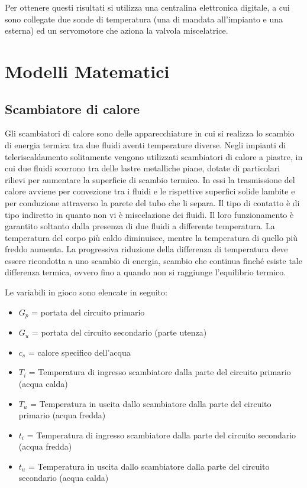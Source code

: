 \documentclass[laurea,oneside,11pt]{USiena_tesiLM}
\begin{document}
Per ottenere questi risultati si utilizza una centralina elettronica digitale, a cui sono collegate due sonde di temperatura (una di mandata all'impianto e una esterna) ed un servomotore che aziona la valvola miscelatrice. 

\chapter{Modelli Matematici}

\section{Scambiatore di calore}
\label{subsec:scambiatore_di_calore}
Gli scambiatori di calore sono  delle apparecchiature in cui si realizza lo scambio di energia termica tra due fluidi aventi temperature diverse. Negli impianti di teleriscaldamento solitamente vengono utilizzati scambiatori di calore a piastre, in cui due fluidi scorrono tra delle lastre metalliche piane, dotate di particolari rilievi per aumentare la superficie di scambio termico. In essi la trasmissione del calore avviene per convezione tra i fluidi e le rispettive superfici solide lambite e per conduzione attraverso la parete del tubo che li separa. Il tipo di contatto è di tipo indiretto in quanto non vi è miscelazione dei fluidi.
Il loro funzionamento è garantito soltanto dalla presenza di due fluidi a differente temperatura. La temperatura del corpo più caldo diminuisce, mentre la temperatura di quello più freddo aumenta. La progressiva riduzione della differenza di temperatura deve essere ricondotta a uno scambio di energia, scambio che continua finché esiste tale differenza termica, ovvero fino a quando non si raggiunge l'equilibrio termico. 

Le variabili in gioco sono elencate in seguito:
\begin{itemize}
\item[] $G_p$ = portata del circuito primario
\item[]$G_u$ = portata del circuito secondario (parte utenza)
\item[]$c_s$ = calore specifico dell'acqua
\item[]$T_i$ = Temperatura di ingresso scambiatore dalla parte del circuito primario (acqua calda)
\item[]$T_u$ = Temperatura in uscita dallo scambiatore dalla parte del circuito primario (acqua fredda)
\item[]$t_i$ = Temperatura di ingresso scambiatore dalla parte del circuito secondario (acqua fredda)
\item[]$t_u$ = Temperatura in uscita dallo scambiatore dalla parte del circuito secondario (acqua calda)
\end{itemize}
\end{document}

